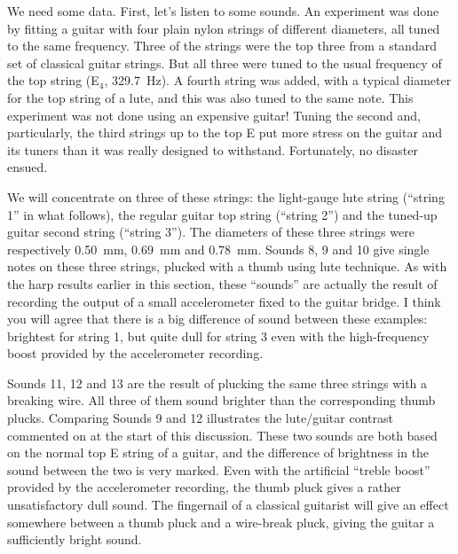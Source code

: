   We need some data. First, let’s listen to some sounds. An experiment was done 
  by fitting a guitar with four plain nylon strings of different diameters, all 
  tuned to the same frequency. Three of the strings were the top three from a 
  standard set of classical guitar strings. But all three were tuned to the 
  usual frequency of the top string (E$_4$, 329.7~Hz). A fourth string was 
  added, with a typical diameter for the top string of a lute, and this was 
  also tuned to the same note. This experiment was not done using an expensive 
  guitar! Tuning the second and, particularly, the third strings up to the top 
  E put more stress on the guitar and its tuners than it was really designed to 
  withstand. Fortunately, no disaster ensued. 

  We will concentrate on three of these strings: the light-gauge lute string 
  (“string 1” in what follows), the regular guitar top string (“string 2”) and 
  the tuned-up guitar second string (“string 3”). The diameters of these three 
  strings were respectively 0.50~mm, 0.69~mm and 0.78~mm. Sounds 8, 9 and 10 
  give single notes on these three strings, plucked with a thumb using lute 
  technique. As with the harp results earlier in this section, these “sounds” 
  are actually the result of recording the output of a small accelerometer 
  fixed to the guitar bridge. I think you will agree that there is a big 
  difference of sound between these examples: brightest for string 1, but quite 
  dull for string 3 even with the high-frequency boost provided by the 
  accelerometer recording. 

\audio{}

\audio{}

\audio{}

  Sounds 11, 12 and 13 are the result of plucking the same three strings with a 
  breaking wire. All three of them sound brighter than the corresponding thumb 
  plucks. Comparing Sounds 9 and 12 illustrates the lute/guitar contrast 
  commented on at the start of this discussion. These two sounds are both based 
  on the normal top E string of a guitar, and the difference of brightness in 
  the sound between the two is very marked. Even with the artificial “treble 
  boost” provided by the accelerometer recording, the thumb pluck gives a 
  rather unsatisfactory dull sound. The fingernail of a classical guitarist 
  will give an effect somewhere between a thumb pluck and a wire-break pluck, 
  giving the guitar a sufficiently bright sound. 

